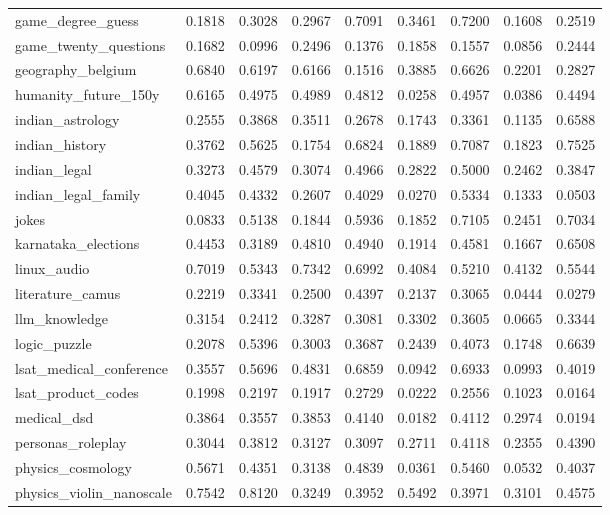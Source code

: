 \begin{landscape}
\begin{longtable}{@{}p{3.8cm}cccccccc@{}}
game\_degree\_guess & 0.1818 & 0.3028 & 0.2967 & 0.7091 & 0.3461 & 0.7200 & 0.1608 & 0.2519 \\
game\_twenty\_questions & 0.1682 & 0.0996 & 0.2496 & 0.1376 & 0.1858 & 0.1557 & 0.0856 & 0.2444 \\
geography\_belgium & 0.6840 & 0.6197 & 0.6166 & 0.1516 & 0.3885 & 0.6626 & 0.2201 & 0.2827 \\
humanity\_future\_150y & 0.6165 & 0.4975 & 0.4989 & 0.4812 & 0.0258 & 0.4957 & 0.0386 & 0.4494 \\
indian\_astrology & 0.2555 & 0.3868 & 0.3511 & 0.2678 & 0.1743 & 0.3361 & 0.1135 & 0.6588 \\
indian\_history & 0.3762 & 0.5625 & 0.1754 & 0.6824 & 0.1889 & 0.7087 & 0.1823 & 0.7525 \\
indian\_legal & 0.3273 & 0.4579 & 0.3074 & 0.4966 & 0.2822 & 0.5000 & 0.2462 & 0.3847 \\
indian\_legal\_family & 0.4045 & 0.4332 & 0.2607 & 0.4029 & 0.0270 & 0.5334 & 0.1333 & 0.0503 \\
jokes & 0.0833 & 0.5138 & 0.1844 & 0.5936 & 0.1852 & 0.7105 & 0.2451 & 0.7034 \\
karnataka\_elections & 0.4453 & 0.3189 & 0.4810 & 0.4940 & 0.1914 & 0.4581 & 0.1667 & 0.6508 \\
linux\_audio & 0.7019 & 0.5343 & 0.7342 & 0.6992 & 0.4084 & 0.5210 & 0.4132 & 0.5544 \\
literature\_camus & 0.2219 & 0.3341 & 0.2500 & 0.4397 & 0.2137 & 0.3065 & 0.0444 & 0.0279 \\
llm\_knowledge & 0.3154 & 0.2412 & 0.3287 & 0.3081 & 0.3302 & 0.3605 & 0.0665 & 0.3344 \\
logic\_puzzle & 0.2078 & 0.5396 & 0.3003 & 0.3687 & 0.2439 & 0.4073 & 0.1748 & 0.6639 \\
lsat\_medical\_conference & 0.3557 & 0.5696 & 0.4831 & 0.6859 & 0.0942 & 0.6933 & 0.0993 & 0.4019 \\
lsat\_product\_codes & 0.1998 & 0.2197 & 0.1917 & 0.2729 & 0.0222 & 0.2556 & 0.1023 & 0.0164 \\
medical\_dsd & 0.3864 & 0.3557 & 0.3853 & 0.4140 & 0.0182 & 0.4112 & 0.2974 & 0.0194 \\
personas\_roleplay & 0.3044 & 0.3812 & 0.3127 & 0.3097 & 0.2711 & 0.4118 & 0.2355 & 0.4390 \\
physics\_cosmology & 0.5671 & 0.4351 & 0.3138 & 0.4839 & 0.0361 & 0.5460 & 0.0532 & 0.4037 \\
physics\_violin\_nanoscale & 0.7542 & 0.8120 & 0.3249 & 0.3952 & 0.5492 & 0.3971 & 0.3101 & 0.4575 \\

\end{longtable}
\end{landscape}
